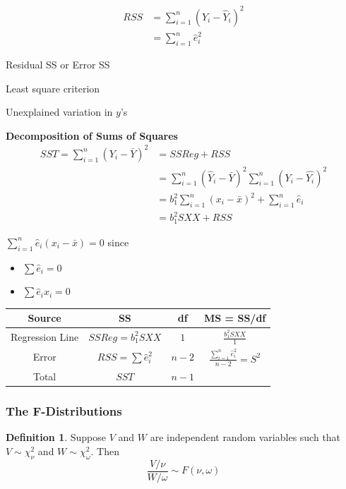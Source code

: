 \documentclass[11pt]{article}
\theoremstyle{definition}
\newtheorem{definition}{Definition}[section]
\numberwithin{equation}{section}
\begin{document}
\begin{align}
  RSS &= \sum^n_{i=1}(Y_i - \hat{Y}_i)^2\\
  &= \sum^n_{i=1}\hat{e}_i^2
\end{align}
\begin{writenotes}
  Residual SS or Error SS

  Least square criterion

  Unexplained variation in $y$'s
\end{writenotes}

\textbf{Decomposition of Sums of Squares}
\begin{align}
  SST = \sum^n_{i=1}(Y_i - \bar{Y})^2 &= SSReg + RSS\\
  &= \sum^n_{i=1}(\hat{Y}_i - \bar{Y})^2 \sum^n_{i=1}(Y_i - \hat{Y_i})^2\\
  &= b_1^2\sum^n_{i=1}(x_i - \bar{x})^2 + \sum^n_{i=1}\hat{e}_i\\
  &= b_1^2SXX + RSS
\end{align}
\begin{writenotes}
  $\sum^n_{i=1}\hat{e}_i(x_i - \bar{x}) = 0$ since
  \begin{itemize}
    \item $\sum \hat{e}_i=0$
    \item $\sum \hat{e}_ix_i=0$
  \end{itemize}
\end{writenotes}

\begin{table}[h!]
\centering
 \begin{tabular}{||c c c c||} 
 \hline
 Source & SS & df & MS = SS/df \\ [0.5ex] 
 \hline\hline
 Regression Line & $SSReg = b_1^2SXX$ & $1$ & $\frac{b_1^2SXX}{1}$ \\
 Error & $RSS=\sum\hat{e}^2_i$ & $n-2$ & $\frac{\sum^n_{i=1}\hat{e}^2_i}{n-2} = S^2$ \\
 Total & $SST$ & $n-1$ &  \\ [1ex]
 \hline
 \end{tabular}
\end{table}

\subsubsection{The F-Distributions}

\begin{definition}
  Suppose $V$ and $W$ are independent random variables such that $V\sim\chi_\nu^2$ and $W\sim\chi_\omega^2$. Then
  \begin{equation}
    \frac{V/\nu}{W/\omega}\sim F(\nu,\omega)
  \end{equation}
\end{definition}
\end{document}
